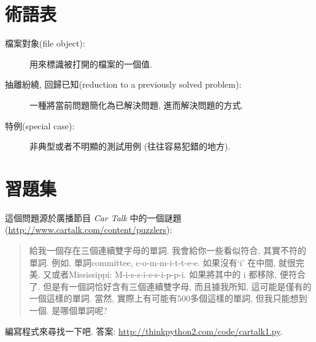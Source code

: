 \documentclass[10pt]{book}
\begin{document}
\section{術語表}

\begin{description}

\item[檔案對象(file object):] 用來標識被打開的檔案的一個值.

\item[抽離紛繞, 回歸已知(reduction to a previously solved problem):] 一種將當前問題簡化為已解決問題, 進而解決問題的方式.

\item[特例(special case):] 非典型或者不明顯的測試用例
(往往容易犯錯的地方).

\end{description}


\section{習題集}

\begin{exercise}

這個問題源於廣播節目 {\em Car Talk} 中的一個謎題
(\url{http://www.cartalk.com/content/puzzlers}):

\begin{quote}
給我一個存在三個連續雙字母的單詞. 
我會給你一些看似符合, 其實不符的單詞. 
例如, 單詞committee,  c-o-m-m-i-t-t-e-e. 
如果沒有`i' 在中間, 就很完美. 
又或者Mississippi: M-i-s-s-i-s-s-i-p-p-i.
如果將其中的 i 都移除, 便符合了. 
但是有一個詞恰好含有三個連續雙字母, 而且據我所知, 
這可能是僅有的一個這樣的單詞. 
當然, 實際上有可能有500多個這樣的單詞, 但我只能想到一個. 
是哪個單詞呢?
\end{quote}

編寫程式來尋找一下吧. 
答案: \url{http://thinkpython2.com/code/cartalk1.py}.

\end{exercise}
\end{document}
